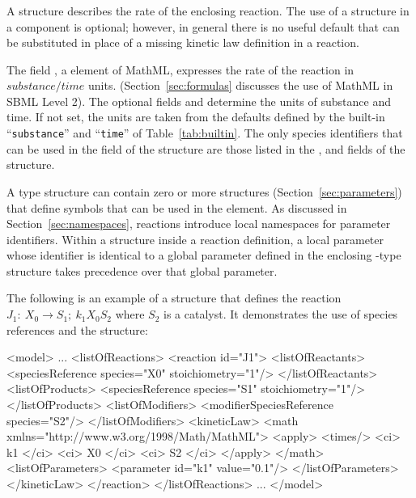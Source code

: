 \documentclass[10pt]{cekarticle}
\newcommand{\vref}[1]{\ref{#1}}
\begin{document}
\subsubsection{}
\label{subsec:kinetic-law}

A  structure describes the rate of the enclosing
reaction.  The use of a  structure in a 
component is optional; however, in general there is no useful default that
can be substituted in place of a missing kinetic law definition in a
reaction.

The field , a  element of MathML,
expresses the rate of the reaction in $substance/time$ units.
(Section~\ref{sec:formulas} discusses the use of MathML in SBML
Level 2). The optional fields  and
 determine the units of substance and time. If
not set, the units are taken from the defaults defined by the
built-in ``\texttt{substance}'' and ``\texttt{time}'' of
Table~\vref{tab:builtin}.  The only species identifiers that can
be used in the  field of the 
structure are those listed in the ,
 and  fields of the
 structure.

A  type structure can contain zero or more
 structures (Section~\ref{sec:parameters}) that
define symbols that can be used in the  element. As
discussed in Section~\ref{sec:namespaces}, reactions introduce
local namespaces for parameter identifiers.  Within a
 structure inside a reaction definition, a local
parameter whose identifier is identical to a global parameter
defined in the enclosing -type structure takes
precedence over that global parameter.

The following is an example of a  structure that
defines the reaction $J_1: \ X_0 \longrightarrow S_1; \ k_1 X_0
S_2$ where $S_2$ is a catalyst. It demonstrates the use of species
references and the  structure:
\begin{example}
<model>
    ...
    <listOfReactions>
        <reaction id="J1">
            <listOfReactants>
                <speciesReference species="X0" stoichiometry="1"/>
            </listOfReactants>
            <listOfProducts>
                <speciesReference species="S1" stoichiometry="1"/>
            </listOfProducts>
            <listOfModifiers>
                <modifierSpeciesReference species="S2"/>
            </listOfModifiers>
            <kineticLaw>
                <math xmlns="http://www.w3.org/1998/Math/MathML">
                    <apply>
                        <times/>
                        <ci> k1 </ci>
                        <ci> X0 </ci>
                        <ci> S2 </ci>
                    </apply>
                </math>
                <listOfParameters>
                    <parameter id="k1" value="0.1"/>
                </listOfParameters>
            </kineticLaw>
        </reaction>
    </listOfReactions>
    ...
</model>
\end{example}
\end{document}
